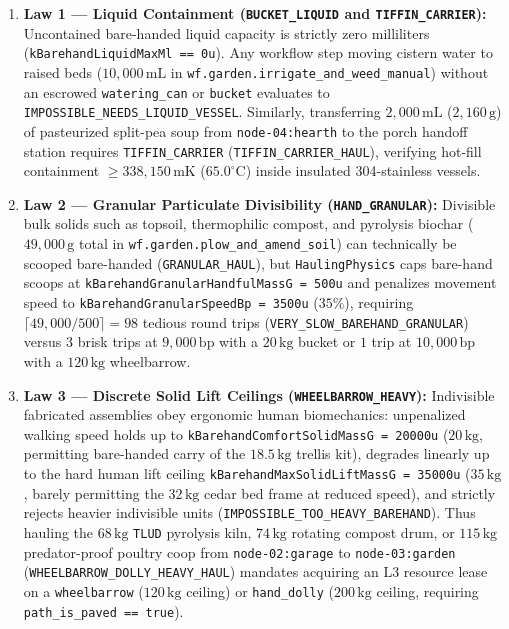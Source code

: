 \begin{enumerate}
    \item \textbf{Law 1 --- Liquid Containment (\texttt{BUCKET\_LIQUID} and \texttt{TIFFIN\_CARRIER}):}
    Uncontained bare-handed liquid capacity is strictly zero milliliters
    (\texttt{kBarehandLiquidMaxMl == 0u}). Any workflow step moving cistern water to raised
    beds ($10{,}000\,\mathrm{mL}$ in \texttt{wf.garden.irrigate\_and\_weed\_manual}) without an
    escrowed \texttt{watering\_can} or \texttt{bucket} evaluates to
    \texttt{IMPOSSIBLE\_NEEDS\_LIQUID\_VESSEL}. Similarly, transferring $2{,}000\,\mathrm{mL}$
    ($2{,}160\,\mathrm{g}$) of pasteurized split-pea soup from \texttt{node-04:hearth} to the
    porch handoff station requires \texttt{TIFFIN\_CARRIER} (\texttt{TIFFIN\_CARRIER\_HAUL}),
    verifying hot-fill containment $\ge 338{,}150\,\mathrm{mK}$ ($65.0^\circ\mathrm{C}$) inside
    insulated 304-stainless vessels.
    \item \textbf{Law 2 --- Granular Particulate Divisibility (\texttt{HAND\_GRANULAR}):}
    Divisible bulk solids such as topsoil, thermophilic compost, and pyrolysis biochar
    ($49{,}000\,\mathrm{g}$ total in \texttt{wf.garden.plow\_and\_amend\_soil}) can technically
    be scooped bare-handed (\texttt{GRANULAR\_HAUL}), but \texttt{HaulingPhysics} caps bare-hand
    scoops at \texttt{kBarehandGranularHandfulMassG = 500u} and penalizes movement speed to
    \texttt{kBarehandGranularSpeedBp = 3500u} ($35\%$), requiring $\lceil 49{,}000 / 500 \rceil
    = 98$ tedious round trips (\texttt{VERY\_SLOW\_BAREHAND\_GRANULAR}) versus $3$ brisk trips
    at $9{,}000\,\mathrm{bp}$ with a $20\,\mathrm{kg}$ bucket or $1$ trip at
    $10{,}000\,\mathrm{bp}$ with a $120\,\mathrm{kg}$ wheelbarrow.
    \item \textbf{Law 3 --- Discrete Solid Lift Ceilings (\texttt{WHEELBARROW\_HEAVY}):}
    Indivisible fabricated assemblies obey ergonomic human biomechanics: unpenalized walking
    speed holds up to \texttt{kBarehandComfortSolidMassG = 20000u} ($20\,\mathrm{kg}$,
    permitting bare-handed carry of the $18.5\,\mathrm{kg}$ trellis kit), degrades linearly up
    to the hard human lift ceiling \texttt{kBarehandMaxSolidLiftMassG = 35000u} ($35\,\mathrm{kg}$,
    barely permitting the $32\,\mathrm{kg}$ cedar bed frame at reduced speed), and strictly
    rejects heavier indivisible units (\texttt{IMPOSSIBLE\_TOO\_HEAVY\_BAREHAND}). Thus hauling
    the $68\,\mathrm{kg}$ \texttt{TLUD} pyrolysis kiln, $74\,\mathrm{kg}$ rotating compost drum,
    or $115\,\mathrm{kg}$ predator-proof poultry coop from \texttt{node-02:garage} to
    \texttt{node-03:garden} (\texttt{WHEELBARROW\_DOLLY\_HEAVY\_HAUL}) mandates acquiring an L3
    resource lease on a \texttt{wheelbarrow} ($120\,\mathrm{kg}$ ceiling) or \texttt{hand\_dolly}
    ($200\,\mathrm{kg}$ ceiling, requiring \texttt{path\_is\_paved == true}).
\end{enumerate}

